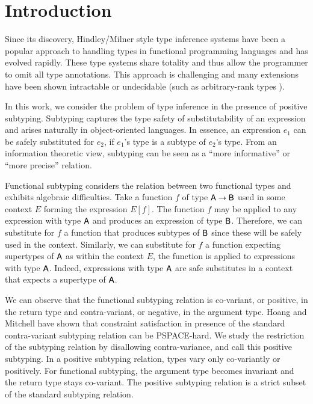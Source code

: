 \documentclass{report}
\begin{document}
  \chapter{Introduction}
  Since its discovery, Hindley/Milner style type inference systems have been a popular approach to
  handling types in functional programming languages and has evolved rapidly. These type systems
  share totality and thus allow the programmer to omit all type annotations. This approach
  is challenging and many extensions have been shown intractable or undecidable (such as
  arbitrary-rank types \cite{kfoury:rank2}).
  
  In this work, we consider the problem of type inference in the presence of positive
  subtyping. Subtyping captures the type safety of substitutability of an expression and arises
  naturally in object-oriented languages.
  In essence, an expression $e_1$ can be safely substituted for $e_2$, if $e_1$'s type
  is a subtype of $e_2$'s type. From an information theoretic view, subtyping can be seen as a
  ``more informative'' or ``more precise'' relation.
  
  Functional subtyping considers the relation between two functional types and exhibits
  algebraic difficulties. Take a function $f$ of type $\textsf{A}\rightarrow\textsf{B}$ used in some context $E$ forming the
  expression $E[f]$. The function $f$ may be applied to any expression with type $\textsf{A}$
  and produces an expression of type $\textsf{B}$. Therefore, we can substitute for $f$ a function that produces
  subtypes of $\textsf{B}$ since these will be safely used in the context. Similarly,
  we can substitute for $f$ a function expecting supertypes of $\textsf{A}$ as within the context $E$,
  the function is applied to expressions with type $\textsf{A}$. Indeed, expressions with type $\textsf{A}$
  are safe substitutes
  in a context that expects a supertype of $\textsf{A}$.
  
  We can observe that the functional subtyping relation is co-variant, or positive,
  in the return type and contra-variant,
  or negative, in the argument type. Hoang and Mitchell \cite{hoang:thesis,hoang:lower-bounds}
  have shown that constraint satisfaction
  in presence of the standard contra-variant subtyping relation can be PSPACE-hard. We study the restriction
  of the subtyping relation by disallowing contra-variance, and call this positive subtyping.
  In a positive subtyping relation, types vary only co-variantly or positively.
  For functional subtyping, the argument type becomes invariant and the return type stays co-variant.
  The positive subtyping relation is a strict subset of the standard subtyping relation.
  
\end{document}
